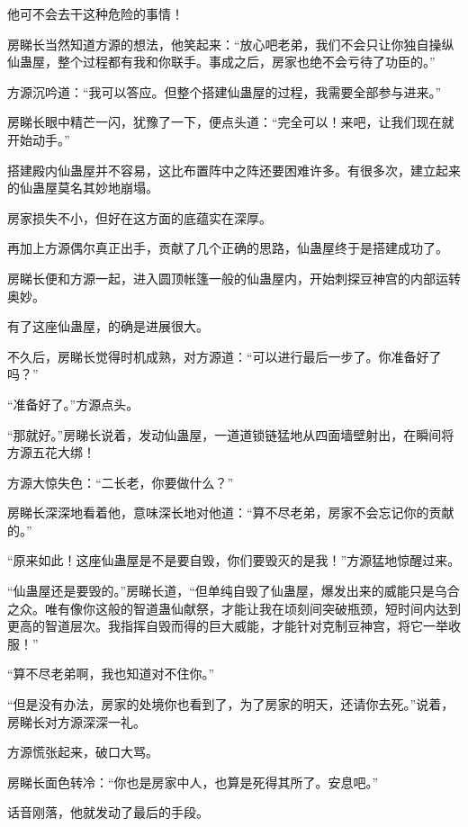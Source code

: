 \begin{this_body}
他可不会去干这种危险的事情！

房睇长当然知道方源的想法，他笑起来：“放心吧老弟，我们不会只让你独自操纵仙蛊屋，整个过程都有我和你联手。事成之后，房家也绝不会亏待了功臣的。”

方源沉吟道：“我可以答应。但整个搭建仙蛊屋的过程，我需要全部参与进来。”

房睇长眼中精芒一闪，犹豫了一下，便点头道：“完全可以！来吧，让我们现在就开始动手。”

搭建殿内仙蛊屋并不容易，这比布置阵中之阵还要困难许多。有很多次，建立起来的仙蛊屋莫名其妙地崩塌。

房家损失不小，但好在这方面的底蕴实在深厚。

再加上方源偶尔真正出手，贡献了几个正确的思路，仙蛊屋终于是搭建成功了。

房睇长便和方源一起，进入圆顶帐篷一般的仙蛊屋内，开始刺探豆神宫的内部运转奥妙。

有了这座仙蛊屋，的确是进展很大。

不久后，房睇长觉得时机成熟，对方源道：“可以进行最后一步了。你准备好了吗？”

“准备好了。”方源点头。

“那就好。”房睇长说着，发动仙蛊屋，一道道锁链猛地从四面墙壁射出，在瞬间将方源五花大绑！

方源大惊失色：“二长老，你要做什么？”

房睇长深深地看着他，意味深长地对他道：“算不尽老弟，房家不会忘记你的贡献的。”

“原来如此！这座仙蛊屋是不是要自毁，你们要毁灭的是我！”方源猛地惊醒过来。

“仙蛊屋还是要毁的。”房睇长道，“但单纯自毁了仙蛊屋，爆发出来的威能只是乌合之众。唯有像你这般的智道蛊仙献祭，才能让我在顷刻间突破瓶颈，短时间内达到更高的智道层次。我指挥自毁而得的巨大威能，才能针对克制豆神宫，将它一举收服！”

“算不尽老弟啊，我也知道对不住你。”

“但是没有办法，房家的处境你也看到了，为了房家的明天，还请你去死。”说着，房睇长对方源深深一礼。

方源慌张起来，破口大骂。

房睇长面色转冷：“你也是房家中人，也算是死得其所了。安息吧。”

话音刚落，他就发动了最后的手段。

\end{this_body}

